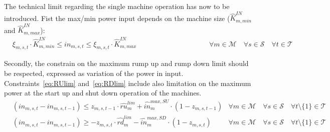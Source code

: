 \documentclass{article}
\newcommand{\cT}{{\mathcal T}}
\newcommand{\cM}{{\mathcal M}}
\newcommand{\cF}{{\mathcal F}}
\newcommand{\cS}{{\mathcal S}}
\begin{document}
{\begin{comment}
		\end{align}	
		\end{comment}			
The technical limit regarding the single machine operation has now to be introduced. Fist the max/min power input depends on the machine size ($\hat{K}_{m,min}^{IN}$ and $\hat{K}_{m,max}^{IN}$):
		\begin{align}
	& \xi_{m,s,t} \cdot \hat{K}_{m,min}^{IN} \leq in_{m,s,t} \leq \xi_{m,s,t} \cdot \hat{K}_{m,max}^{IN} & \hspace{4cm} \forall m \in \cM \quad \forall s \in \cS \quad \forall t \in \cT \label{eq:In_lim}
		\end{align}
		\begin{comment}
		\begin{align}
	& f_{m,s,t} \geq \xi_{m,s,t} \cdot \hat{K}_{m,min}^{IN} & \hspace{7cm} \forall m \in \cF \quad \forall s \in \cS \quad \forall t \in \cT \label{eq:Min_fuel}\\
	& f_{m,s,t} \leq \xi_{m,s,t} \cdot \hat{K}_{m,max}^{IN} &\forall m \in \cF \quad \forall s \in \cS \quad \forall t \in \cT \label{eq:Max_fuel}\\
	& el_{m,s,t}^{cons} \geq \xi_{m,s,t} \cdot \hat{K}_{m,min}^{IN} & \forall m \in \cF \quad \forall s \in \cS \quad \forall t \in \cT \label{eq:Min_el}\\
	& el_{m,s,t}^{cons} \leq \xi_{m,s,t} \cdot \hat{K}_{m,max}^{IN} & \forall m \in \cF \quad \forall s \in \cS \quad \forall t \in \cT \label{eq:Max_el}
		\end{align}
		\end{comment}
Secondly, the constrain on the maximum rump up and rump down limit should be respected, expressed as variation of the power in input. Constraints~\eqref{eq:RUlim} and~\eqref{eq:RDlim} include also limitation on the maximum power at the start up and shut down operation of the machines. 
		\begin{align}
		& (in_{m,s,t} - in_{m,s,t-1}) \leq  z_{m, s, t-1} \cdot \hat{ru}_{m}^{lim} + \hat{in}_{m}^{max, SU} \cdot (1-z_{m,s,t-1}) & \hspace{0cm} \forall m \in \cM \quad \forall s \in \cS \quad \forall t \setminus\{1\} \in \cT \label{eq:RUlim}\\
		& (in_{m,s,t} - in_{m,s,t-1}) \geq -z_{m,s,t} \cdot \hat{rd}_{m}^{lim} - \hat{in}_{m}^{max, SD} \cdot (1-z_{m,s,t}) & \hspace{0cm} \forall m \in \cM \quad \forall s \in \cS \quad \forall t \setminus\{1\} \in \cT \label{eq:RDlim}
		\end{align}
}
\end{document}
